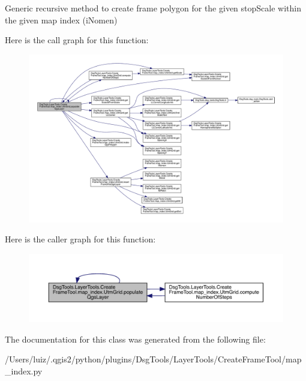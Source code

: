 \begin{DoxyVerb}Generic recursive method to create frame polygon for the given
stopScale within the given map index (iNomen)
\end{DoxyVerb}
 Here is the call graph for this function\+:
\nopagebreak
\begin{figure}[H]
\begin{center}
\leavevmode
\includegraphics[width=350pt]{class_dsg_tools_1_1_layer_tools_1_1_create_frame_tool_1_1map__index_1_1_utm_grid_a233e42aa31272b74df7f1ea5a3d2583f_cgraph}
\end{center}
\end{figure}
Here is the caller graph for this function\+:
\nopagebreak
\begin{figure}[H]
\begin{center}
\leavevmode
\includegraphics[width=350pt]{class_dsg_tools_1_1_layer_tools_1_1_create_frame_tool_1_1map__index_1_1_utm_grid_a233e42aa31272b74df7f1ea5a3d2583f_icgraph}
\end{center}
\end{figure}


The documentation for this class was generated from the following file\+:\begin{DoxyCompactItemize}
\item 
/\+Users/luiz/.\+qgis2/python/plugins/\+Dsg\+Tools/\+Layer\+Tools/\+Create\+Frame\+Tool/map\+\_\+index.\+py\end{DoxyCompactItemize}
